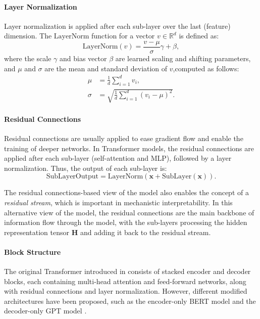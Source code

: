 \paragraph{Layer Normalization}
Layer normalization \parencite{ba_layer_2016} is applied after each sub-layer over the last (feature) dimension. The $\text{LayerNorm}$ function for a vector $v \in \mathbb{R}^d$ is defined as:
\begin{equation*}
    \text{LayerNorm}(v) = \frac{v - \mu}{\sigma}\gamma + \beta,
\end{equation*}
where the scale $\gamma$ and bias vector $\beta$ are learned scaling and shifting parameters, and $\mu$ and $\sigma$ are the mean and standard deviation of $v$,computed as follows:
\begin{align*}
    \mu    & = \frac{1}{d} \sum_{i=1}^{d} v_i,                  \\
    \sigma & = \sqrt{\frac{1}{d} \sum_{i=1}^{d} (v_i - \mu)^2}.
\end{align*}

\paragraph{Residual Connections}
Residual connections \parencite{he_deep_2016} are usually applied to ease gradient flow and enable the training of deeper networks. In Transformer models, the residual connections are applied after each sub-layer (self-attention and MLP), followed by a layer normalization. Thus, the output of each sub-layer is:
\begin{equation*}
    \text{SubLayerOutput} = \text{LayerNorm}(\mathbf{x} + \text{SubLayer}(\mathbf{x})).
\end{equation*}

The residual connections-based view of the model also enables the concept of a \emph{residual stream}, which is important in mechanistic interpretability. In this alternative view of the model, the residual connections are the main backbone of information flow through the model, with the sub-layers processing the hidden representation tensor $\mathbf{H}$ and adding it back to the residual stream.

\paragraph{Block Structure}
The original Transformer introduced in \cite{vaswani_attention_2017} consists of stacked encoder and decoder blocks, each containing multi-head attention and feed-forward networks, along with residual connections and layer normalization. However, different modified architectures have been proposed, such as the encoder-only BERT model \parencite{devlin_bert_2019} and the decoder-only GPT model \parencite{radford_improving_2018}.

